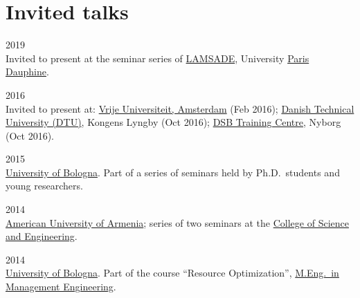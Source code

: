 \section*{Invited talks}

\begin{paracol}{2}
  \textsc{2019}
\switchcolumn
  \\
  Invited to present at the seminar series of \href{https://www.lamsade.dauphine.fr/}{LAMSADE}, University \href{https://www.dauphine.psl.eu/}{Paris Dauphine}.
\end{paracol}

\begin{paracol}{2}
  \textsc{2016}
\switchcolumn
  \\
  Invited to present at: \href{https://www.vu.nl/}{Vrije Universiteit, Amsterdam} (Feb 2016); \href{https://www.dtu.dk/}{Danish Technical University (DTU)}, Kongens Lyngby (Oct 2016); \href{https://www.dsb.dk/}{DSB Training Centre}, Nyborg (Oct 2016).
\end{paracol}

\begin{paracol}{2}
  \textsc{2015}
\switchcolumn
  \\
  \href{https://www.unibo.it}{University of Bologna}. Part of a series of seminars held by Ph.D.\ students and young researchers.
\end{paracol}

\begin{paracol}{2}
  \textsc{2014}
\switchcolumn
  \\
  \href{https://www.aua.am/}{American University of Armenia}; series of two seminars at the \href{http://cse.aua.am/}{College of Science and Engineering}.
\end{paracol}

\begin{paracol}{2}
  \textsc{2014}
\switchcolumn
  \\
  \href{https://www.unibo.it}{University of Bologna}. Part of the course ``Resource Optimization'', \href{https://corsi.unibo.it/magistrale/IngegneriaGestionale}{M.Eng.\ in Management Engineering}.
\end{paracol}
